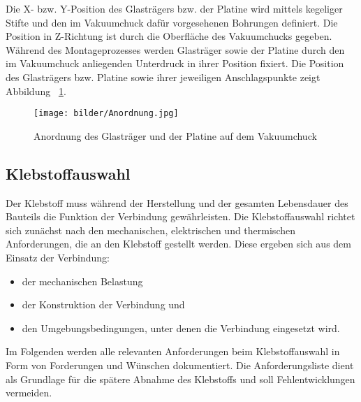 Die X- bzw. Y-Position des Glasträgers bzw. der Platine wird mittels kegeliger Stifte und den im Vakuumchuck dafür vorgesehenen Bohrungen definiert. Die Position in Z-Richtung ist durch die Oberfläche des Vakuumchucks gegeben. Während des Montageprozesses werden Glasträger sowie der Platine durch den im Vakuumchuck anliegenden Unterdruck in ihrer Position fixiert. Die Position des Glasträgers bzw. Platine sowie ihrer jeweiligen Anschlagspunkte zeigt Abbildung ~\ref{fig:Anordnung}.

\begin{figure}[H]
    \centering
    \texttt{[image: bilder/Anordnung.jpg]}
    \caption{Anordnung des Glasträger und der Platine auf dem Vakuumchuck}
    \label{fig:Anordnung}
\end{figure}

\subsection{Klebstoffauswahl}
Der Klebstoff muss während der Herstellung und der gesamten Lebensdauer des Bauteils die Funktion der Verbindung gewährleisten. Die Klebstoffauswahl richtet sich zunächst nach den mechanischen, elektrischen und thermischen Anforderungen, die an den Klebstoff gestellt werden. Diese ergeben sich aus dem Einsatz der Verbindung:
\begin{itemize}
    \item der mechanischen Belastung
    \item der Konstruktion der Verbindung und 
    \item den Umgebungsbedingungen, unter denen die Verbindung eingesetzt wird.
\end{itemize}
Im Folgenden werden alle relevanten Anforderungen beim Klebstoffauswahl in Form von Forderungen und Wünschen dokumentiert. Die Anforderungsliste dient als Grundlage für die spätere Abnahme des Klebstoffs und soll Fehlentwicklungen vermeiden.

